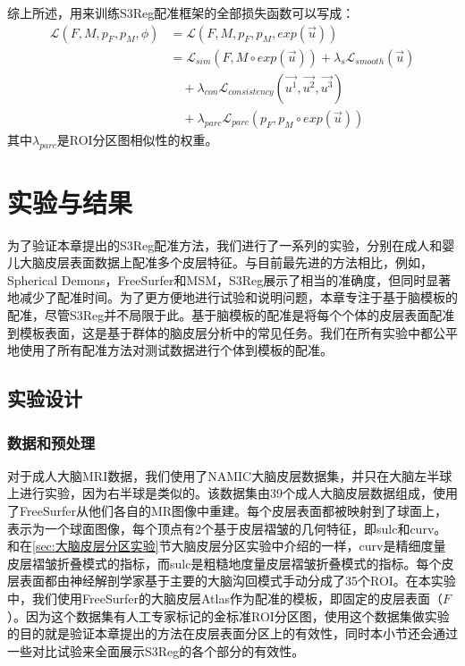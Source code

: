 综上所述，用来训练S3Reg配准框架的全部损失函数可以写成：
\begin{equation}
	\begin{split}
	{\mathcal{L}}(F,M,p_F, p_M,\phi) & = {\mathcal{L}}(F,M,p_F,p_M,exp(\overrightarrow{u})) \\
	& = {\mathcal{L}}_{sim}(F,M\circ exp(\overrightarrow{u})) + \lambda_s {\mathcal{L}}_{smooth}(\overrightarrow{u}) \\
	& \quad + \lambda_{con} {\mathcal{L}}_{consistency}(\overrightarrow{u^1}, \overrightarrow{u^2}, \overrightarrow{u^3}) \\
	& \quad + \lambda_{parc} {\mathcal{L}}_{parc}(p_F,p_M \circ exp(\overrightarrow{u})) 
	\end{split}
\end{equation}
其中$\lambda_{parc}$是ROI分区图相似性的权重。





\section{实验与结果}
为了验证本章提出的S3Reg配准方法，我们进行了一系列的实验，分别在成人和婴儿大脑皮层表面数据上配准多个皮层特征。与目前最先进的方法相比，例如，Spherical Demons\cite{yeo2009spherical}，FreeSurfer\cite{fischl1999high}和MSM\cite{robinson2014msm}，S3Reg展示了相当的准确度，但同时显著地减少了配准时间。为了更方便地进行试验和说明问题，本章专注于基于脑模板的配准，尽管S3Reg并不局限于此。基于脑模板的配准是将每个个体的皮层表面配准到模板表面，这是基于群体的脑皮层分析中的常见任务。我们在所有实验中都公平地使用了所有配准方法对测试数据进行个体到模板的配准。

\subsection{实验设计}
\subsubsection{数据和预处理}\label{sec:S3Reg的数据和预处理}
对于成人大脑MRI数据，我们使用了NAMIC大脑皮层数据集\cite{namic}，并只在大脑左半球上进行实验，因为右半球是类似的。该数据集由39个成人大脑皮层数据组成，使用了FreeSurfer\cite{dale1999cortical}从他们各自的MR图像中重建。每个皮层表面都被映射到了球面上，表示为一个球面图像，每个顶点有2个基于皮层褶皱的几何特征，即sulc和curv\cite{fischl2012freesurfer}。和在\ref{sec:大脑皮层分区实验}节大脑皮层分区实验中介绍的一样，curv是精细度量皮层褶皱折叠模式的指标，而sulc是粗糙地度量皮层褶皱折叠模式的指标。每个皮层表面都由神经解剖学家基于主要的大脑沟回模式\cite{desikan2006automated}手动分成了35个ROI。在本实验中，我们使用FreeSurfer的大脑皮层Atlas\cite{fischl2012freesurfer}作为配准的模板，即固定的皮层表面（$F$）。因为这个数据集有人工专家标记的金标准ROI分区图，使用这个数据集做实验的目的就是验证本章提出的方法在皮层表面分区上的有效性，同时本小节还会通过一些对比试验来全面展示S3Reg的各个部分的有效性。

